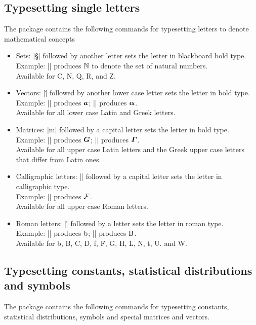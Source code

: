 \documentclass[12pt, a4paper]{ltxguide}
\begin{document}
\subsection{Typesetting single letters}
The package contains the following commands for typesetting letters to denote mathematical concepts
\begin{itemize}
    \item Sets: |\S| followed by another letter sets the letter in blackboard bold type. \\ Example: |\SN| produces $\mathbb{N}$ to denote the set of natural numbers. \\ Available for C, N, Q, R, and Z.
    \item Vectors: |\v| followed by another lower case letter sets the letter in bold type. \\ Example: |\va| produces $\bm a$; |\valpha| produces $\bm \alpha$. \\ Available for all lower case Latin and Greek letters.
    \item Matrices: |m| followed by a capital letter sets the letter in bold type. \\ Example: |\mG| produces $\bm G$; |\mGamma| produces $\bm \varGamma$. \\ Available for all upper case Latin letters and the Greek upper case letters that differ from Latin ones.
    \item Calligraphic letters: |\cal| followed by a capital letter sets the letter in calligraphic type. \\ Example: |\calF| produces $\mathcal{F}$. \\ Available for all upper case Roman letters.
    \item Roman letters: |\r| followed by a letter sets the letter in roman type. \\ Example: |\rb| produces $\mathrm{b}$; |\rB| produces $\mathrm{B}$. \\ Available for b, B, C, D, f, F, G, H, L, N, t, U. and W.
\end{itemize}

\subsection{Typesetting constants, statistical distributions and symbols}
The package contains the following commands for typesetting constants, statistical distributions, symbols and special matrices and vectors.
\end{document}
